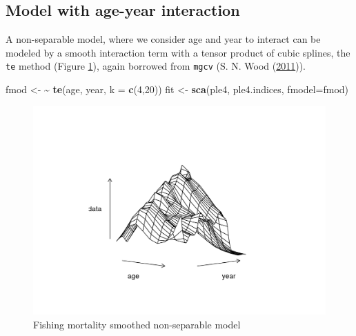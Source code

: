 \documentclass[
]{book}
\newenvironment{Shaded}{\begin{snugshade}}{\end{snugshade}}
\newcommand{\AttributeTok}[1]{\textcolor[rgb]{0.13,0.29,0.53}{#1}}
\newcommand{\DecValTok}[1]{\textcolor[rgb]{0.00,0.00,0.81}{#1}}
\newcommand{\ErrorTok}[1]{\textcolor[rgb]{0.64,0.00,0.00}{\textbf{#1}}}
\newcommand{\FunctionTok}[1]{\textcolor[rgb]{0.13,0.29,0.53}{\textbf{#1}}}
\newcommand{\NormalTok}[1]{#1}
\newcommand{\OtherTok}[1]{\textcolor[rgb]{0.56,0.35,0.01}{#1}}
\begin{document}
\hypertarget{model-with-age-year-interaction}{%
\subsection{Model with age-year interaction}\label{model-with-age-year-interaction}}

A non-separable model, where we consider age and year to interact can be modeled by a smooth interaction term with a tensor product of cubic splines, the \texttt{te} method (Figure \ref{fig:te1}), again borrowed from \texttt{mgcv} (S. N. Wood (\protect\hyperlink{ref-R-mgcv}{2011})).

\begin{Shaded}
\begin{Highlighting}[]
\NormalTok{fmod }\OtherTok{\textless{}{-}} \ErrorTok{\textasciitilde{}} \FunctionTok{te}\NormalTok{(age, year, }\AttributeTok{k =} \FunctionTok{c}\NormalTok{(}\DecValTok{4}\NormalTok{,}\DecValTok{20}\NormalTok{))}
\NormalTok{fit }\OtherTok{\textless{}{-}} \FunctionTok{sca}\NormalTok{(ple4, ple4.indices, }\AttributeTok{fmodel=}\NormalTok{fmod)}
\end{Highlighting}
\end{Shaded}

\begin{figure}
\centering
\includegraphics{_bookdown_files/_main_files/figure-html/te1-1.png}
\caption{\label{fig:te1}Fishing mortality smoothed non-separable model}
\end{figure}
\end{document}
